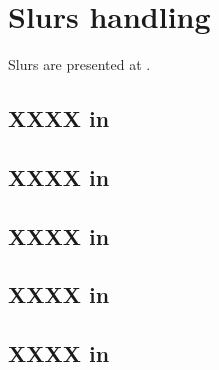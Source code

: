 



\chapter{Slurs handling}

Slurs are presented at .


\section{XXXX in \mxsrToMsr{}}


\section{XXXX in \mxsrToMsr{}}


\section{XXXX in \msrToMsr{}}


\section{XXXX in \msrToLpsr{}}


\section{XXXX in \lpsrToLilypond{}}


